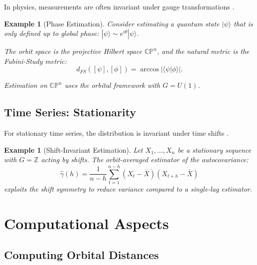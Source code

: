 \documentclass[11pt]{article}
\newtheorem{example}[theorem]{Example}
\newcommand{\Z}{\mathbb{Z}}
\begin{document}
In physics, measurements are often invariant under gauge transformations \citep{Weinberg1995}.

\begin{example}[Phase Estimation]\label{ex:quantum}
Consider estimating a quantum state $|\psi\rangle$ that is only defined up to global phase: $|\psi\rangle \sim e^{i\theta}|\psi\rangle$.

The orbit space is the projective Hilbert space $\mathbb{CP}^n$, and the natural metric is the Fubini-Study metric:
\begin{equation}\label{eq:fubini_study}
d_{FS}([\psi], [\phi]) = \arccos|\langle\psi|\phi\rangle|.
\end{equation}

Estimation on $\mathbb{CP}^n$ uses the orbital framework with $G = U(1)$.
\end{example}

\subsection{Time Series: Stationarity}

For stationary time series, the distribution is invariant under time shifts \citep{Brockwell1991}.

\begin{example}[Shift-Invariant Estimation]\label{ex:time_series}
Let $X_1, \ldots, X_n$ be a stationary sequence with $G = \Z$ acting by shifts. The orbit-averaged estimator of the autocovariance:
\begin{equation}\label{eq:autocovariance}
\hat{\gamma}(h) = \frac{1}{n-h} \sum_{t=1}^{n-h} (X_t - \bar{X})(X_{t+h} - \bar{X})
\end{equation}
exploits the shift symmetry to reduce variance compared to a single-lag estimator.
\end{example}

\section{Computational Aspects}
\label{sec:computation}

\subsection{Computing Orbital Distances}
\end{document}
